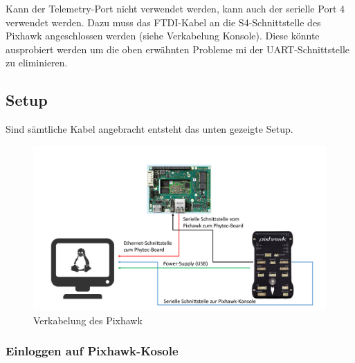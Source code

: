 \documentclass[12pt]{article} %
\begin{document}
	\noindent
	Kann der Telemetry-Port nicht verwendet werden, kann auch der serielle Port 4 verwendet werden. Dazu muss das FTDI-Kabel an die S4-Schnittstelle des Pixhawk angeschlossen werden (siehe Verkabelung Konsole). Diese könnte ausprobiert werden um die oben erwähnten Probleme mi der UART-Schnittstelle zu eliminieren. 
	\newpage
	\subsection{Setup} \label{Setup}
	
	Sind sämtliche Kabel angebracht entsteht das unten gezeigte Setup.
	\begin{figure}[H]
		\centering
		\includegraphics[scale=0.7]{Setup}
		\caption{Verkabelung des Pixhawk}
		\label{2}
	\end{figure}
	
	
	\subsubsection{Einloggen auf Pixhawk-Kosole}
	
\end{document}

